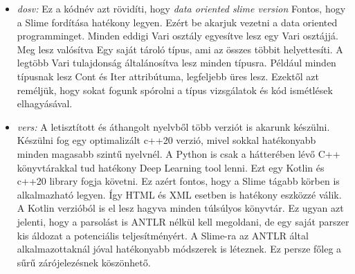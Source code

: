 {\begin{itemize}
\begin{itemize}
\item \emph{dosv:}
Ez a kódnév azt rövidíti, hogy \textit{data oriented slime version}
Fontos, hogy a Slime fordítása hatékony legyen.
Ezért be akarjuk vezetni a data oriented programminget.
Minden eddigi Vari osztály egyesítve lesz egy Vari osztájjá.
Meg lesz valósítva Egy saját tároló típus, ami az összes többit helyettesíti.
A legtöbb Vari tulajdonság általánosítva lesz minden típusra.
Például minden típusnak lesz Cont és Iter attribútuma, legfeljebb üres lesz.
Ezektől azt reméljük, hogy sokat fogunk spórolni a típus vizsgálatok és kód ismétlések elhagyásával.

\item \emph{vers:}
A letisztított és áthangolt nyelvből több verziót is akarunk készülni.
Készülni fog egy optimalizált c++20 verzió, mivel sokkal hatékonyabb minden magasabb szintű nyelvnél.
A Python is csak a hátterében lévő C++ könyvtárakkal tud hatékony Deep Learning tool lenni.
Ezt egy Kotlin és c++20 library fogja követni.
Ez azért fontos, hogy a Slime tágabb körben is alkalmazható legyen.
Így HTML és XML esetben is hatékony eszközzé válik.
A Kotlin verzióból is el lesz hagyva minden túlsúlyos könyvtár.
Ez ugyan azt jelenti, hogy a parsolást is ANTLR nélkül kell megoldani, de egy saját parszer kis áldozat a potenciális teljesítményért.
A Slime-ra az ANTLR által alkalmazottaknál jóval hatékonyabb módszerek is léteznek.
Ez persze főleg a sűrű zárójelezésnek köszönhető.
\end{itemize}


\end{itemize}}
